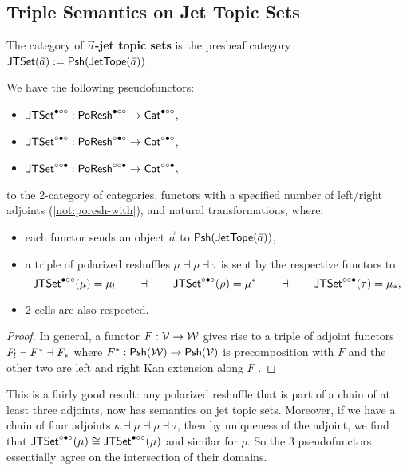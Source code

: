\documentclass[a4paper]{memoir}
\begin{document}
\subsection{Triple Semantics on Jet Topic Sets} \label{sec:poresh-jtset:triple}
\begin{definition}
	The category of \textbf{$\vec a$-jet topic sets} is the presheaf category $\mathsf{JTSet}(\vec a) := {\mathsf{Psh}}(\mathsf{JetTope}(\vec a))$.
\end{definition}
\begin{theorem} \label{thm:poresh-jettopicset}
	We have the following pseudofunctors:
	\begin{itemize}
		\item $\mathsf{JTSet}^{\bullet \circ \circ} : \mathsf{PoResh}^{\bullet \circ \circ} \to {\mathsf{Cat}}^{\bullet \circ \circ}$,
		\item $\mathsf{JTSet}^{\circ \bullet \circ} : \mathsf{PoResh}^{\circ \bullet \circ} \to {\mathsf{Cat}}^{\circ \bullet \circ}$,
		\item $\mathsf{JTSet}^{\circ \circ \bullet} : \mathsf{PoResh}^{\circ \circ \bullet} \to {\mathsf{Cat}}^{\circ \circ \bullet}$,
	\end{itemize}
	to the 2-category of categories, functors with a specified number of left/right adjoints (\cref{not:poresh-with}), and natural transformations, where:
	\begin{itemize}
		\item each functor sends an object $\vec a$ to ${\mathsf{Psh}}(\mathsf{JetTope}(\vec a))$,
		\item a triple of polarized reshuffles $\mu \dashv \rho \dashv \tau$ is sent by the respective functors to
		\[
			\mathsf{JTSet}^{\bullet \circ \circ}(\mu) = {\mu}_!
			\qquad\dashv\qquad
			\mathsf{JTSet}^{\circ \bullet \circ}(\rho) = {\mu}^*
			\qquad\dashv\qquad
			\mathsf{JTSet}^{\circ \circ \bullet}(\tau) = {\mu}_*,
		\]
		\item 2-cells are also respected.
	\end{itemize}
\end{theorem}
\begin{proof}
	In general, a functor $F : {\mathcal{V}} \to {\mathcal{W}}$ gives rise to a triple of adjoint functors ${F}_! \dashv {F}^* \dashv {F}_*$ where ${F}^* : {\mathsf{Psh}}({\mathcal{W}}) \to {\mathsf{Psh}}({\mathcal{V}})$ is precomposition with $F$ and the other two are left and right Kan extension along $F$ \cite{stacks-adjoints,nlab:lifting-functors}\cite[\S 2.3.8]{nuyts-phd}.
\end{proof}
This is a fairly good result: any polarized reshuffle that is part of a chain of at least three adjoints, now has semantics on jet topic sets.
Moreover, if we have a chain of four adjoints $\kappa \dashv \mu \dashv \rho \dashv \tau$, then by uniqueness of the adjoint, we find that $\mathsf{JTSet}^{\circ \bullet \circ}(\mu) \cong \mathsf{JTSet}^{\bullet \circ \circ}(\mu)$ and similar for $\rho$.
So the 3 pseudofunctors essentially agree on the intersection of their domains.
\end{document}

